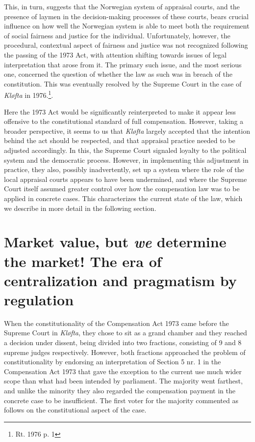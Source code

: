 This, in turn, suggests that the Norwegian system of appraisal courts, and the presence of laymen in the decision-making processes of these courts, bears crucial influence on how well the Norwegian system is able to meet both the requirement of social fairness and justice for the individual. Unfortunately, however, the procedural, contextual aspect of fairness and justice was not recognized following the passing of the 1973 Act, with attention shifting towards issues of legal interpretation that arose from it. The primary such issue, and the most serious one, concerned the question of whether the law as such was in breach of the constitution. This  was eventually resolved by the Supreme Court in the case of \emph{Kløfta} in 1976.\footnote{Rt. 1976 p. 1}. 

Here the 1973 Act would be significantly reinterpreted to make it appear less offensive to the constitutional standard of full compensation. However, taking a broader perspective, it seems to us that \emph{Kløfta} largely accepted that the intention behind the act should be respected, and that appraisal practice needed to be adjusted accordingly. In this, the Supreme Court signaled loyalty to the political system and the democratic process. However, in implementing this adjustment in practice, they also, possibly inadvertently, set up a system where the role of the local appraisal courts appears to have been undermined, and where the Supreme Court itself assumed greater control over how the compensation law was to be applied in concrete cases. This characterizes the current state of the law, which we describe in more detail in the following section.

\section{Market value, but \emph{we} determine the market! The era of centralization and pragmatism by regulation}\label{sec:regab}

When the constitutionality of the Compensation Act 1973 came before the Supreme Court in \emph{Kløfta}, they chose to sit as a grand chamber and they reached a decision under dissent, being divided into two fractions, consisting of 9 and 8 supreme judges respectively. However, both fractions approached the problem of constitutionality by endorsing an interpretation of Section 5 nr. 1 in the Compensation Act 1973 that gave the exception to the current use much wider scope than what had been intended by parliament. The majority went farthest, and unlike the minority they also regarded the compensation payment in the concrete case to be insufficient. The first voter for the majority commented as follows on the constitutional aspect of the case.

